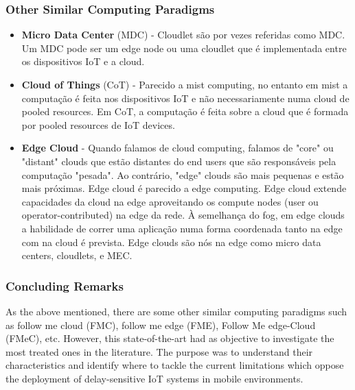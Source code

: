 \subsubsection{Other Similar Computing Paradigms}
\begin{itemize}
	\item \textbf{Micro Data Center} (MDC) - Cloudlet são por vezes referidas
	como MDC. Um MDC pode ser um edge node ou uma cloudlet que é implementada
	entre os dispositivos IoT e a cloud.
	\item \textbf{Cloud of Things} (CoT) - Parecido a mist computing, no entanto
	em mist a computação é feita nos dispositivos IoT e não necessariamente numa
	cloud de pooled resources. Em CoT, a computação é feita sobre a cloud que é
	formada por pooled resources de IoT devices.
	\item \textbf{Edge Cloud} - Quando falamos de cloud computing, falamos de
	"core" ou "distant" clouds que estão distantes do end users que são
	responsáveis pela computação "pesada". Ao contrário, "edge" clouds são mais
	pequenas e estão mais próximas. Edge cloud é parecido a edge computing. Edge
	cloud extende capacidades da cloud na edge aproveitando os compute nodes
	(user ou operator-contributed) na edge da rede. À semelhança do fog, em edge
	clouds a habilidade de correr uma aplicação numa forma coordenada tanto na
	edge com na cloud é prevista. Edge clouds são nós na edge como micro data
	centers, cloudlets, e MEC.
\end{itemize}

\subsubsection{Concluding Remarks}
As the above mentioned, there are some other similar computing paradigms such as follow me cloud (FMC), follow me edge (FME), Follow Me edge-Cloud (FMeC), etc. However, this state-of-the-art had as objective to investigate the most treated ones in the literature. The purpose was to understand their characteristics and identify where to tackle the current limitations which oppose the deployment of delay-sensitive IoT systems in mobile environments.

